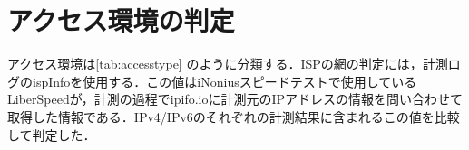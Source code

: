 \section{アクセス環境の判定}
\label{label:accesstype}
アクセス環境は\cref{tab:accesstype} のように分類する．ISPの網の判定には，計測ログのispInfoを使用する．この値はiNoniusスピードテストで使用しているLiberSpeedが，計測の過程でipifo.ioに計測元のIPアドレスの情報を問い合わせて取得した情報である．IPv4/IPv6のそれぞれの計測結果に含まれるこの値を比較して判定した．


